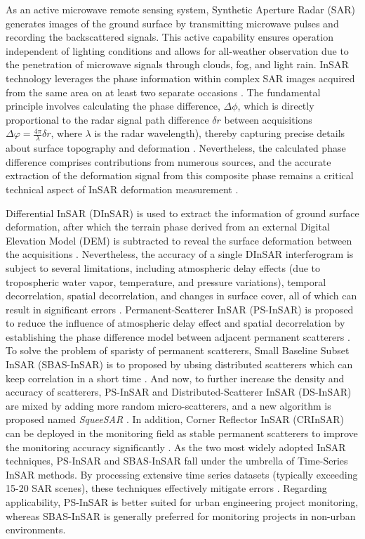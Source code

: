 \documentclass[preprint,11pt,authoryear,3p]{elsarticle}
\begin{document}
As an active microwave remote sensing system, Synthetic Aperture Radar (SAR) generates images of the ground surface by transmitting microwave pulses and recording the backscattered signals. This active capability ensures operation independent of lighting conditions and allows for all-weather observation due to the penetration of microwave signals through clouds, fog, and light rain. InSAR technology leverages the phase information within complex SAR images acquired from the same area on at least two separate occasions \citep{8977523}. The fundamental principle involves calculating the phase difference, $\Delta \phi$, which is directly proportional to the radar signal path difference $\delta r$ between acquisitions $\Delta\varphi=\frac{4\pi}{\lambda}\delta r$, where $\lambda$ is the radar wavelength), thereby capturing precise details about surface topography and deformation \citep{752187}. Nevertheless, the calculated phase difference comprises contributions from numerous sources, and the accurate extraction of the deformation signal from this composite phase remains a critical technical aspect of InSAR deformation measurement \citep{HU20141}. 

Differential InSAR (DInSAR) is used to extract the information of ground surface deformation, after which the terrain phase derived from an external Digital Elevation Model (DEM) is subtracted to reveal the surface deformation between the acquisitions \citep{GIUDICEPIETRO2024104060}. Nevertheless, the accuracy of a single DInSAR interferogram is subject to several limitations, including atmospheric delay effects (due to tropospheric water vapor, temperature, and pressure variations), temporal decorrelation, spatial decorrelation, and changes in surface cover, all of which can result in significant errors \citep{SAMSONOV2024114049}. Permanent-Scatterer InSAR (PS-InSAR) is proposed to reduce the influence of atmospheric delay effect and spatial decorrelation by establishing the phase difference model between adjacent permanent scatterers \citep{ferretti1999permanent, ferretti2002permanent}. To solve the problem of sparisty of permanent scatterers, Small Baseline Subset InSAR (SBAS-InSAR) is to proposed by ubsing distributed scatterers which can keep correlation in a short time \citep{berardino2002new}. And now, to further increase the density and accuracy of scatterers, PS-InSAR and Distributed-Scatterer InSAR (DS-InSAR) are mixed by adding more random micro-scatterers, and a new algorithm is proposed named \textit{SqueeSAR} \citep{Ferretti2011SqueeSAR, MontiGuarnieri2008TargetStatistics, samiei2016phase, even2018insar}. In addition, Corner Reflector InSAR (CRInSAR) can be deployed in the monitoring field as stable permanent scatterers to improve the monitoring accuracy significantly \citep{Luzi2022ActiveReflector, Garthwaite2017CRDesign}. As the two most widely adopted InSAR techniques, PS-InSAR and SBAS-InSAR fall under the umbrella of Time-Series InSAR methods. By processing extensive time series datasets (typically exceeding 15-20 SAR scenes), these techniques effectively mitigate errors \citep{TimeSeriesInSAR}. Regarding applicability, PS-InSAR is better suited for urban engineering project monitoring, whereas SBAS-InSAR is generally preferred for monitoring projects in non-urban environments.
\end{document}
